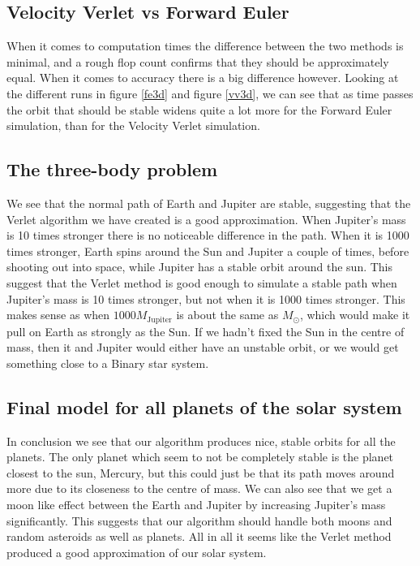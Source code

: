 \documentclass[a4paper]{article}
\begin{document}
	\subsection{Velocity Verlet vs Forward Euler}
	When it comes to computation times the difference between the two methods is minimal, and a rough flop count confirms that they should be approximately equal. When it comes to accuracy there is a big difference however. Looking at the different runs in figure \ref{fe3d} and figure \ref{vv3d}, we can see that as time passes the orbit that should be stable widens quite a lot more for the Forward Euler simulation, than for the Velocity Verlet simulation.
	
	\subsection{The three-body problem}
	We see that the normal path of Earth and Jupiter are stable, suggesting that the Verlet algorithm we have created is a good approximation. When Jupiter's mass is 10 times stronger there is no noticeable difference in the path. When it is 1000 times stronger, Earth spins around the Sun and Jupiter a couple of times, before shooting out into space, while Jupiter has a stable orbit around the sun. This suggest that the Verlet method is good enough to simulate a stable path when Jupiter's mass is 10 times stronger, but not when it is 1000 times stronger. This makes sense as when $1000M_{\text{Jupiter}}$ is about the same as $M_{\odot}$, which would make it pull on Earth as strongly as the Sun. If we hadn't fixed the Sun in the centre of mass, then it and Jupiter would either have an unstable orbit, or we would get something close to a Binary star system.
	
	\subsection{Final model for all planets of the solar system}
	In conclusion we see that our algorithm produces nice, stable orbits for all the planets. The only planet which seem to not be completely stable is the planet closest to the sun, Mercury, but this could just be that its path moves around more due to its closeness to the centre of mass. We can also see that we get a moon like effect between the Earth and Jupiter by increasing Jupiter's mass significantly. This suggests that our algorithm should handle both moons and random asteroids as well as planets. All in all it seems like the Verlet method produced a good approximation of our solar system.
	
\end{document}
